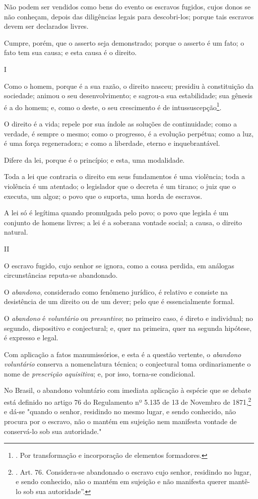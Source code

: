Não podem ser vendidos como bens do evento os escravos fugidos, cujos
donos se não conheçam, depois das diligências legais para descobri-los;
porque tais escravos devem ser declarados livres.

Cumpre, porém, que o asserto seja demonstrado; porque o asserto é um
fato; o fato tem sua causa; e esta causa é o direito.

I

Como o homem, porque é a sua razão, o direito nasceu; presidiu à
constituição da sociedade; animou o seu desenvolvimento; e sagrou-a sua
estabilidade; sua gênesis é a do homem; e, como o deste, o seu
crescimento é de intussuscepção\footnote{. Por transformação e
  incorporação de elementos formadores.}.

O direito é a vida; repele por sua índole as soluções de continuidade;
como a verdade, é sempre o mesmo; como o progresso, é a evolução
perpétua; como a luz, é uma força regeneradora; e como a liberdade,
eterno e inquebrantável.

Difere da lei, porque é o princípio; e esta, uma modalidade.

Toda a lei que contraria o direito em seus fundamentos é uma violência;
toda a violência é um atentado; o legislador que o decreta é um tirano;
o juiz que o executa, um algoz; o povo que o suporta, uma horda de
escravos.

A lei só é legítima quando promulgada pelo povo; o povo que legisla é um
conjunto de homens livres; a lei é a soberana vontade social; a causa, o
direito natural.

II

O escravo fugido, cujo senhor se ignora, como a cousa perdida, em
análogas circunstâncias reputa-se abandonado.

O \emph{abandono}, considerado como fenômeno jurídico, é relativo e
consiste na desistência de um direito ou de um dever; pelo que é
essencialmente formal.

O \emph{abandono} é \emph{voluntário} ou \emph{presuntivo}; no primeiro
caso, é direto e individual; no segundo, dispositivo e conjectural; e,
quer na primeira, quer na segunda hipótese, é expresso e legal.

Com aplicação a fatos manumissórios, e esta é a questão vertente, o
\emph{abandono voluntário} conserva a nomenclatura técnica; o
conjectural toma ordinariamente o nome de \emph{prescrição aquisitiva};
e, por isso, torna-se condicional.

No Brasil, o abandono voluntário com imediata aplicação à espécie que se
debate está definido no artigo 76 do Regulamento nº 5.135 de 13 de
Novembro de 1871,\footnote{. Art. 76. Considera-se abandonado o escravo
  cujo senhor, residindo no lugar, e sendo conhecido, não o mantém em
  sujeição e não manifesta querer mantê-lo sob sua autoridade''.} e
dá-se "quando o senhor, residindo no mesmo lugar, e sendo conhecido, não
procura por o escravo, não o mantém em sujeição nem manifesta vontade de
conservá-lo sob sua autoridade."

